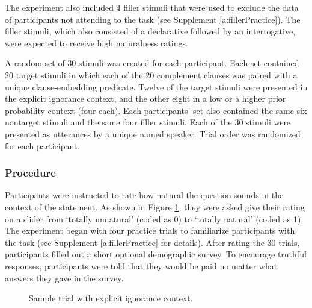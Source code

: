 \documentclass[11pt,fleqn]{article}
\newcommand{\6}{\mbox{$[\hspace*{-.6mm}[$}}
\newcommand{\9}{\mbox{$]\hspace*{-.6mm}]$}}
\begin{document}
The experiment also included 4 filler stimuli that were used to exclude the data of participants not attending to the task (see Supplement \ref{a:fillerPractice}). The filler stimuli, which also consisted of a declarative followed by an interrogative, were expected to receive high naturalness ratings.

A random set of 30 stimuli was created for each participant. Each set contained 20 target stimuli in which each of the 20 complement clauses was paired with a unique clause-embedding predicate. Twelve of the target stimuli were presented in the explicit ignorance context, and the other eight in a low or a higher prior probability context (four each). Each participants' set also contained the same six nontarget stimuli and the same four filler stimuli. Each of the 30 stimuli were presented as utterances by a unique named speaker. Trial order was randomized for each participant. 

\subsubsection{Procedure}

Participants were instructed to rate how natural the question sounds in the context of the statement. As shown in Figure \ref{f:trials}, they were asked give their rating on a slider from `totally unnatural' (coded as 0) to `totally natural' (coded as 1). The experiment began with four practice trials to familiarize participants with the task (see Supplement \ref{a:fillerPractice} for details). After rating the 30 trials, participants filled out a short optional demographic survey. To encourage truthful responses, participants were told that they would be paid no matter what answers they gave in the survey.


\begin{figure}[h]
\centering
\caption{Sample trial with explicit ignorance context.}\label{f:trials}
\end{figure}
\end{document}
